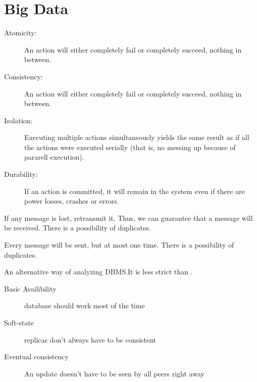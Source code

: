 \section{Big Data}
\begin{definition}[ACID]\label{def:acid}
    \begin{description}
        \item[Atomicity:] An action will either completely fail or completely succeed, nothing  in between.
        \item[Consistency:] An action will either completely fail or completely succeed, nothing  in between.
        \item[Isolation:] Executing multiple actions simultaneously yields the same result as if all the actions
            were executed serially (that is, no messing up because of pararell execution).
        \item[Durability:] If an action is committed, it will remain in the system even if there are
            power losses, crashes or errors.
    \end{description}
\end{definition}

\begin{definition}\label{def:atleastonce}
    If any message is lost, retransmit it. Thus, we can guarantee that a message will be received.
    There is a possibility of duplicates.
\end{definition}

\begin{definition}\label{def:atmostonce}
    Every message will be sent, but at most one time.
    There is a possibility of duplicates.
\end{definition}

\begin{definition}[BASE]\label{def:base}
    An alternative way of analyzing DBMS.\@ It is less strict than .
    \begin{description}
        \item[Basic Availibility] database should work most of the time
        \item[Soft-state] replicas don't always have to be consistent
        \item[Eventual consistency] An update doesn't have to be seen by all peers right away
    \end{description}
\end{definition}

